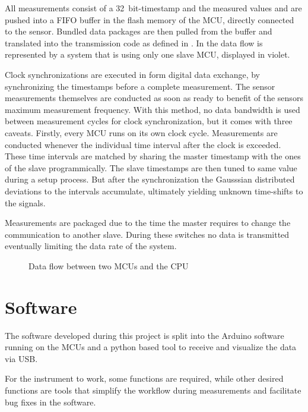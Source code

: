 All measurements consist of a \SI{32}{bit}-timestamp and the measured values and are pushed into a \ac{FIFO} buffer in the flash memory of the \ac{MCU}, directly connected to the sensor. Bundled data packages are then pulled from the buffer and translated into the transmission code as defined in . In  the data flow is represented by a system that is using only one slave \ac{MCU}, displayed in violet.

Clock synchronizations are executed in form digital data exchange, by synchronizing the timestamps before a complete measurement. The sensor measurements themselves are conducted as soon as ready to benefit of the sensors maximum measurement frequency. With this method, no data bandwidth is used between measurement cycles for clock synchronization, but it comes with three caveats. Firstly, every \ac{MCU} runs on its own clock cycle. Measurements are conducted whenever the individual time interval after the clock is exceeded. These time intervals are matched by sharing the master timestamp with the ones of the slave programmically. The slave timestamps are then tuned to same value during a setup process. But after the synchronization the Gausssian distributed deviations to the intervals accumulate, ultimately yielding unknown time-shifts to the signals.


Measurements are packaged due to the time the master requires to change the communication to another slave. During these switches no data is transmitted eventually limiting the data rate of the system.

\begin{figure}[!htb]
  \centering
  
  \caption[Data flow]{Data flow between two \ac{MCU}s and the CPU%
    \label{fig:data_flow}}
\end{figure}

\section{Software}

The software developed during this project is split into the Arduino software running on the \acs{MCU}s and a python based tool to receive and visualize the data via \ac{USB}.

For the instrument to work, some functions are required, while other desired functions are tools that simplify the workflow during measurements and facilitate bug fixes in the software.

